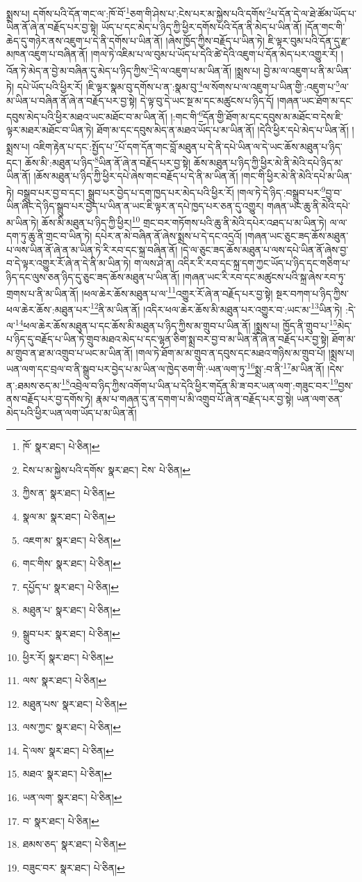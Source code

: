 སྨྲས་པ། དགོས་པའི་དོན་གང་ལ་:ཁོ་བོ་\footnote{ཁོ་  སྣར་ཐང་།  པེ་ཅིན། }ཅག་གི་ཤེས་པ་:ངེས་པར་མ་སྐྱེས་པའི་དགོས་\footnote{ངེས་པ་མ་སྐྱེས་པའི་དགོས་  སྣར་ཐང་། ངེས་  པེ་ཅིན། }པ་དོན་དེ་ལ་ཐེ་ཚོམ་ཡོད་པ་ཡིན་ནོ་ཞེ་ན་བརྗོད་པར་བྱ་སྟེ། ཡོད་པ་དང་མེད་པ་ཉིད་ཀྱི་ཕྱིར་དགོས་པའི་དོན་ནི་མེད་པ་ཡིན་ནོ། །དོན་གང་གི་ཆེད་དུ་གཉེར་ནས་འཇུག་པ་དེ་ནི་དགོས་པ་ཡིན་ནོ། །ཞེས་ཁྱོད་ཀྱིས་བརྗོད་པ་ཡིན་ཏེ། ཇི་ལྟར་བུམ་པའི་དོན་དུ་རྫ་མཁན་འཇུག་པ་བཞིན་ནོ། །གལ་ཏེ་འཇིམ་པ་ལ་བུམ་པ་ཡོད་པ་དེའི་ཚེ་དེའི་འཇུག་པ་དོན་མེད་པར་འགྱུར་རོ། །འོན་ཏེ་མེད་ན་བྱེ་མ་བཞིན་དུ་མེད་པ་ཉིད་ཀྱིས་\footnote{ཀྱིས་ན་  སྣར་ཐང་།  པེ་ཅིན། }དེ་ལ་འཇུག་པ་མ་ཡིན་ནོ། །སྨྲས་པ། བྱེ་མ་ལ་འཇུག་པ་ནི་མ་ཡིན་ཏེ། དཔེ་ཡོད་པའི་ཕྱིར་རོ། །ཇི་ལྟར་སྣམ་བུ་དགོས་པ་ན་:སྣམ་བུ་\footnote{སྣལ་མ་  སྣར་ཐང་།  པེ་ཅིན། }ལ་སོགས་པ་ལ་འཇུག་པ་ཡིན་གྱི་:འཇུག་པ་\footnote{འཇག་མ་  སྣར་ཐང་།  པེ་ཅིན། }ལ་མ་ཡིན་པ་བཞིན་ནོ་ཞེ་ན་བརྗོད་པར་བྱ་སྟེ། དེ་ལྟ་བུ་དེ་ཡང་སྔ་མ་དང་མཚུངས་པ་ཉིད་དོ། །གཞན་ཡང་ཐོག་མ་དང་དབུས་མེད་པའི་ཕྱིར་མཐའ་ཡང་མཐོང་བ་མ་ཡིན་ནོ། །:གང་གི་\footnote{གང་གིས་  སྣར་ཐང་།  པེ་ཅིན། }དོན་གྱི་ཐོག་མ་དང་དབུས་མ་མཐོང་བ་དེས་ཇི་ལྟར་མཐར་མཐོང་བ་ཡིན་ཏེ། ཐོག་མ་དང་དབུས་མེད་ན་མཐའ་ཡོད་པ་མ་ཡིན་ནོ། །དེའི་ཕྱིར་དཔེ་མེད་པ་ཡིན་ནོ། །སྨྲས་པ། འཇིག་རྟེན་པ་དང་:སྤྱོད་པ་\footnote{དཔྱོད་པ་  སྣར་ཐང་།  པེ་ཅིན། }པོ་དག་དོན་གང་བློ་མཐུན་པ་དེ་ནི་དཔེ་ཡིན་ལ་དེ་ཡང་ཆོས་མཐུན་པ་ཉིད་དང་། ཆོས་མི་:མཐུན་པ་ཉིད་\footnote{མཐུན་པ་  སྣར་ཐང་།  པེ་ཅིན། }ཡིན་ནོ་ཞེ་ན་བརྗོད་པར་བྱ་སྟེ། ཆོས་མཐུན་པ་ཉིད་ཀྱི་ཕྱིར་མེ་ནི་མེའི་དཔེ་ཉིད་མ་ཡིན་ནོ། །ཆོས་མཐུན་པ་ཉིད་ཀྱི་ཕྱིར་དཔེ་ཞེས་གང་བརྗོད་པ་དེ་ནི་མ་ཡིན་ནོ། །གང་གི་ཕྱིར་མེ་ནི་མེའི་དཔེ་མ་ཡིན་ཏེ། བསྒྲུབ་པར་བྱ་བ་དང་། སྒྲུབ་པར་བྱེད་པ་དག་ཁྱད་པར་མེད་པའི་ཕྱིར་རོ། །གལ་ཏེ་དེ་ཉིད་:བསྒྲུབ་པར་\footnote{སྒྲུབ་པར་  སྣར་ཐང་།  པེ་ཅིན། }བྱ་བ་ཡིན་ཞིང་དེ་ཉིད་སྒྲུབ་པར་བྱེད་པ་ཡིན་ན་ཡང་ཇི་ལྟར་ན་དཔེ་ཁྱད་པར་ཅན་དུ་འགྱུར། གཞན་ཡང་ཆུ་ནི་མེའི་དཔེ་མ་ཡིན་ཏེ། ཆོས་མི་མཐུན་པ་ཉིད་ཀྱི་ཕྱིར།\footnote{ཕྱིར་རོ།  སྣར་ཐང་།  པེ་ཅིན། } གྲང་བར་གཏོགས་པའི་ཆུ་ནི་མེའི་དཔེར་འཐད་པ་མ་ཡིན་ཏེ། ལ་ལ་དག་ཏུ་ཆུ་ནི་གྲང་བ་ཡིན་ཏེ། དཔེར་ན་མེ་བཞིན་ནོ་ཞེས་སྨྲས་པ་དེ་དང་འདྲའོ། །གཞན་ཡང་ཅུང་ཟད་ཆོས་མཐུན་པ་ལས་ཡིན་ནོ་ཞེ་ན་མ་ཡིན་ཏེ་རི་རབ་དང་སྐྲ་བཞིན་ནོ། །དེ་ལ་ཅུང་ཟད་ཆོས་མཐུན་པ་ལས་དཔེ་ཡིན་ནོ་ཞེས་བྱ་བ་དེ་ལྟར་འགྱུར་རོ་ཞེ་ན་དེ་ནི་མ་ཡིན་ཏེ། ག་ལས་ཤེ་ན། འདིར་རི་རབ་དང་སྐྲ་དག་ཀྱང་ཡོད་པ་ཉིད་དང་གཅིག་པ་ཉིད་དང་ལུས་ཅན་ཉིད་དུ་ཅུང་ཟད་ཆོས་མཐུན་པ་ཡིན་ནོ། །གཞན་ཡང་རི་རབ་དང་མཚུངས་པའི་སྐྲ་ཞེས་རབ་ཏུ་གྲགས་པ་ནི་མ་ཡིན་ནོ། །ཕལ་ཆེར་ཆོས་མཐུན་པ་ལ་\footnote{ལས་  སྣར་ཐང་།  པེ་ཅིན། }འགྱུར་རོ་ཞེ་ན་བརྗོད་པར་བྱ་སྟེ། སྔར་བཀག་པ་ཉིད་ཀྱིས་ཕལ་ཆེར་ཆོས་:མཐུན་པར་\footnote{མཐུན་པས་  སྣར་ཐང་།  པེ་ཅིན། }ནི་མ་ཡིན་ནོ། །འདིར་ཕལ་ཆེར་ཆོས་མི་མཐུན་པར་འགྱུར་བ་:ཡང་མ་\footnote{ལས་ཀྱང་  སྣར་ཐང་།  པེ་ཅིན། }ཡིན་ཏེ། :དེ་ལ་\footnote{དེ་ལས་  སྣར་ཐང་།  པེ་ཅིན། }ཕལ་ཆེར་ཆོས་མཐུན་པ་དང་ཆོས་མི་མཐུན་པ་ཉིད་ཀྱིས་མ་གྲུབ་པ་ཡིན་ནོ། །སྨྲས་པ། ཁྱོད་ནི་གྲུབ་པ་\footnote{མཐའ་  སྣར་ཐང་།  པེ་ཅིན། }མེད་པ་ཉིད་དུ་བརྗོད་པ་ཡིན་ཏེ་གྲུབ་མཐའ་མེད་པ་དང་ལྷན་ཅིག་སྨྲ་བར་བྱ་བ་མ་ཡིན་ནོ་ཞེ་ན་བརྗོད་པར་བྱ་སྟེ། ཐོག་མ་མ་གྲུབ་ན་ཐ་མ་འགྲུབ་པ་ཡང་མ་ཡིན་ནོ། །གལ་ཏེ་ཐོག་མ་མ་གྲུབ་ན་དབུས་དང་མཐའ་གཉིས་མ་གྲུབ་པོ། །སྨྲས་པ། ཡན་ལག་དང་བྲལ་བ་ནི་སྒྲུབ་པར་བྱེད་པ་མ་ཡིན་ལ་ཁྱེད་ཅག་གི་:ཡན་ལག་ཏུ་\footnote{ཡན་ལག་  སྣར་ཐང་།  པེ་ཅིན། }སྨྲ་:བ་ནི་\footnote{བ་  སྣར་ཐང་།  པེ་ཅིན། }མ་ཡིན་ནོ། །དེས་ན་:ཐམས་ཅད་མ་\footnote{ཐམས་ཅད་  སྣར་ཐང་།  པེ་ཅིན། }འབྲེལ་བ་ཉིད་ཀྱིས་འགོག་པ་ཡིན་པ་དེའི་ཕྱིར་གདོན་མི་ཟ་བར་ཡན་ལག་:གཟུང་བར་\footnote{བཟུང་བར་  སྣར་ཐང་།  པེ་ཅིན། }བྱས་ནས་བརྗོད་པར་བྱ་དགོས་ཏེ། རྣམ་པ་གཞན་དུ་ན་དགག་པ་མི་འགྲུབ་པོ་ཞེ་ན་བརྗོད་པར་བྱ་སྟེ། ཡན་ལག་ཅན་མེད་པའི་ཕྱིར་ཡན་ལག་ཡོད་པ་མ་ཡིན་ནོ། 